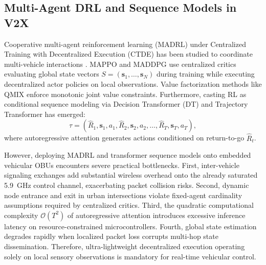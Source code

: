 \documentclass[journal]{IEEEtran}
\begin{document}
\subsection{Multi-Agent DRL and Sequence Models in V2X}
Cooperative multi-agent reinforcement learning (MADRL) under Centralized Training with Decentralized Execution (CTDE) has been studied to coordinate multi-vehicle interactions \cite{Wang2023Multi, Yu2022Surprising, Lowe2017Multi}. MAPPO \cite{Yu2022Surprising} and MADDPG \cite{Lowe2017Multi} use centralized critics evaluating global state vectors $S = (\mathbf{s}_1, \dots, \mathbf{s}_N)$ during training while executing decentralized actor policies on local observations. Value factorization methods like QMIX \cite{Rashid2018QMIX} enforce monotonic joint value constraints. Furthermore, casting RL as conditional sequence modeling via Decision Transformer (DT) \cite{Chen2021Decision} and Trajectory Transformer \cite{Janner2021Offline} has emerged:
\begin{equation}
\label{eq:dt_seq}
\tau = \left( \hat{R}_1, \mathbf{s}_1, a_1, \hat{R}_2, \mathbf{s}_2, a_2, \dots, \hat{R}_T, \mathbf{s}_T, a_T \right),
\end{equation}
where autoregressive attention generates actions conditioned on return-to-go $\hat{R}_t$.

However, deploying MADRL and transformer sequence models onto embedded vehicular OBUs encounters severe practical bottlenecks. First, inter-vehicle signaling exchanges add substantial wireless overhead onto the already saturated 5.9~GHz control channel, exacerbating packet collision risks. Second, dynamic node entrance and exit in urban intersections violate fixed-agent cardinality assumptions required by centralized critics. Third, the quadratic computational complexity $\mathcal{O}(T^2)$ of autoregressive attention introduces excessive inference latency on resource-constrained microcontrollers. Fourth, global state estimation degrades rapidly when localized packet loss corrupts multi-hop state dissemination. Therefore, ultra-lightweight decentralized execution operating solely on local sensory observations is mandatory for real-time vehicular control.
\end{document}
